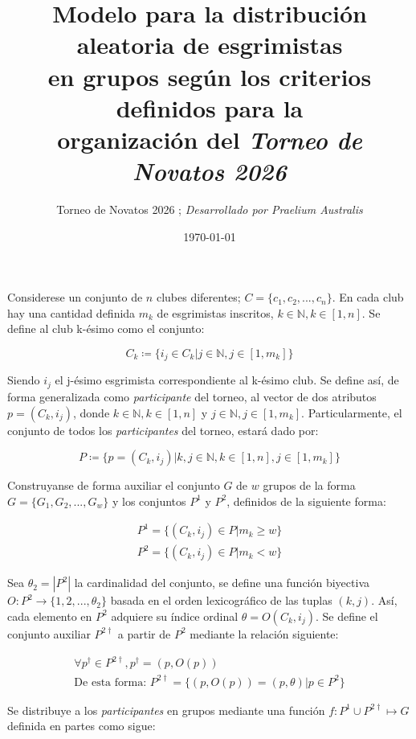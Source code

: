 \documentclass[10pt]{article}
\title{\textbf{Modelo para la distribución aleatoria de esgrimistas\\
en grupos según los criterios definidos para la\\ 
organización del \textit{Torneo de Novatos 2026}}}
\author{Torneo de Novatos 2026 ; \textit{Desarrollado por Praelium Australis}}
\date{\today}
\begin{document}
\maketitle

\noindent Considerese un conjunto de $n$ clubes diferentes; $C = \{c_1, c_2, ... , c_n\}$. En cada club hay una cantidad definida $m_k$ %
de esgrimistas inscritos, $k \in \mathds{N}, k \in [1,n]$. Se define al club k-ésimo como el conjunto:

\begin{equation*}
C_k \coloneq \{i_j \in C_k | j \in \mathds{N},  j \in [1,m_k]\}
\end{equation*}

\noindent Siendo $i_j$ el j-ésimo esgrimista correspondiente al k-ésimo club. Se define así, de forma generalizada como \textit{participante} %
del torneo, al vector de dos atributos $p = (C_k, i_j)$, donde $k \in \mathds{N}, k \in [1,n]$ y $j \in \mathds{N}, j \in [1,m_k]$. %
Particularmente, el conjunto de todos los \textit{participantes} del torneo, estará dado por:

\begin{equation*}
P \coloneq \{ p = (C_k, i_j) | k,j \in \mathds{N}, k \in [1,n], j \in [1,m_k]\}
\end{equation*}

\noindent Construyanse de forma auxiliar el conjunto $G$ de $w$ grupos de la forma $G = \{ G_1, G_2, ... , G_w\}$ y los conjuntos $P^1$ y $P^2$, %
definidos de la siguiente forma:

\begin{align*}
    P^1 = \{ (C_k, i_j) \in P | m_k \geq w\} \\
    P^2 = \{ (C_k, i_j) \in P | m_k < w\}
\end{align*}

\noindent Sea $\theta_2 = |P^2|$ la cardinalidad del conjunto, se define una función biyectiva $O : P^2 \rightarrow \{ 1,2,...,\theta_2\}$ basada en %
el orden lexicográfico de las tuplas $(k,j)$. Así, cada elemento en $P^2$ adquiere su índice ordinal $\theta = O(C_k,i_j)$. Se define el conjunto auxiliar $P^{2\dag}$ %
a partir de $P^2$ mediante la relación siguiente:


\begin{align*}
\forall p^\dag \in P^{2\dag}, p^\dag = (p, O(p)) \\
\text{De esta forma: } P^{2\dag} = \{ (p, O(p)) = (p, \theta) | p \in P^2\}
\end{align*}

\noindent Se distribuye a los \textit{participantes} en grupos mediante una función $f : P^1 \cup P^{2\dag} \mapsto G$ definida en partes como sigue:
\end{document}
